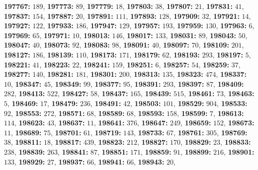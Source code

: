 \textsf{\bfseries 197767:} $189$, \textsf{\bfseries 197773:} $89$, \textsf{\bfseries 197779:} $18$, \textsf{\bfseries 197803:} $38$, \textsf{\bfseries 197807:} $21$, \textsf{\bfseries 197831:} $41$, \textsf{\bfseries 197837:} $154$, \textsf{\bfseries 197887:} $20$, \textsf{\bfseries 197891:} $111$, \textsf{\bfseries 197893:} $128$, \textsf{\bfseries 197909:} $32$, \textsf{\bfseries 197921:} $14$, \textsf{\bfseries 197927:} $122$, \textsf{\bfseries 197933:} $186$, \textsf{\bfseries 197947:} $129$, \textsf{\bfseries 197957:} $193$, \textsf{\bfseries 197959:} $130$, \textsf{\bfseries 197963:} $6$, \textsf{\bfseries 197969:} $65$, \textsf{\bfseries 197971:} $10$, \textsf{\bfseries 198013:} $146$, \textsf{\bfseries 198017:} $133$, \textsf{\bfseries 198031:} $89$, \textsf{\bfseries 198043:} $50$, \textsf{\bfseries 198047:} $40$, \textsf{\bfseries 198073:} $92$, \textsf{\bfseries 198083:} $98$, \textsf{\bfseries 198091:} $40$, \textsf{\bfseries 198097:} $70$, \textsf{\bfseries 198109:} $201$, \textsf{\bfseries 198127:} $186$, \textsf{\bfseries 198139:} $110$, \textsf{\bfseries 198173:} $171$, \textsf{\bfseries 198179:} $62$, \textsf{\bfseries 198193:} $293$, \textsf{\bfseries 198197:} $5$, \textsf{\bfseries 198221:} $41$, \textsf{\bfseries 198223:} $22$, \textsf{\bfseries 198241:} $159$, \textsf{\bfseries 198251:} $6$, \textsf{\bfseries 198257:} $54$, \textsf{\bfseries 198259:} $37$, \textsf{\bfseries 198277:} $140$, \textsf{\bfseries 198281:} $181$, \textsf{\bfseries 198301:} $200$, \textsf{\bfseries 198313:} $135$, \textsf{\bfseries 198323:} $474$, \textsf{\bfseries 198337:} $10$, \textsf{\bfseries 198347:} $45$, \textsf{\bfseries 198349:} $99$, \textsf{\bfseries 198377:} $95$, \textsf{\bfseries 198391:} $293$, \textsf{\bfseries 198397:} $87$, \textsf{\bfseries 198409:} $282$, \textsf{\bfseries 198413:} $522$, \textsf{\bfseries 198427:} $58$, \textsf{\bfseries 198437:} $165$, \textsf{\bfseries 198439:} $515$, \textsf{\bfseries 198461:} $73$, \textsf{\bfseries 198463:} $5$, \textsf{\bfseries 198469:} $17$, \textsf{\bfseries 198479:} $236$, \textsf{\bfseries 198491:} $42$, \textsf{\bfseries 198503:} $101$, \textsf{\bfseries 198529:} $904$, \textsf{\bfseries 198533:} $92$, \textsf{\bfseries 198553:} $272$, \textsf{\bfseries 198571:} $68$, \textsf{\bfseries 198589:} $68$, \textsf{\bfseries 198593:} $158$, \textsf{\bfseries 198599:} $7$, \textsf{\bfseries 198613:} $114$, \textsf{\bfseries 198623:} $43$, \textsf{\bfseries 198637:} $11$, \textsf{\bfseries 198641:} $376$, \textsf{\bfseries 198647:} $249$, \textsf{\bfseries 198659:} $152$, \textsf{\bfseries 198673:} $11$, \textsf{\bfseries 198689:} $75$, \textsf{\bfseries 198701:} $61$, \textsf{\bfseries 198719:} $143$, \textsf{\bfseries 198733:} $67$, \textsf{\bfseries 198761:} $305$, \textsf{\bfseries 198769:} $38$, \textsf{\bfseries 198811:} $18$, \textsf{\bfseries 198817:} $439$, \textsf{\bfseries 198823:} $212$, \textsf{\bfseries 198827:} $170$, \textsf{\bfseries 198829:} $23$, \textsf{\bfseries 198833:} $238$, \textsf{\bfseries 198839:} $263$, \textsf{\bfseries 198841:} $87$, \textsf{\bfseries 198851:} $171$, \textsf{\bfseries 198859:} $91$, \textsf{\bfseries 198899:} $216$, \textsf{\bfseries 198901:} $133$, \textsf{\bfseries 198929:} $27$, \textsf{\bfseries 198937:} $66$, \textsf{\bfseries 198941:} $66$, \textsf{\bfseries 198943:} $20$, 
